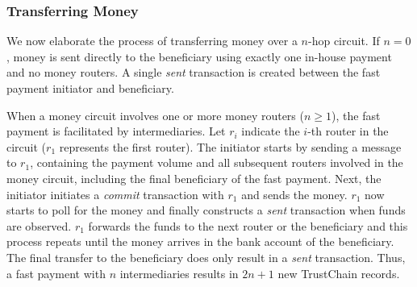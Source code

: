 \subsubsection*{Transferring Money}
We now elaborate the process of transferring money over a $ n $-hop circuit.
If $ n = 0 $, money is sent directly to the beneficiary using exactly one in-house payment and no money routers.
A single \emph{sent} transaction is created between the fast payment initiator and beneficiary.

When a money circuit involves one or more money routers ($ n \geq 1 $), the fast payment is facilitated by intermediaries.
Let $ r_i $ indicate the $ i $-th router in the circuit ($ r_1 $ represents the first router).
The initiator starts by sending a message to $ r_1 $, containing the payment volume and all subsequent routers involved in the money circuit, including the final beneficiary of the fast payment.
Next, the initiator initiates a \emph{commit} transaction with $ r_1 $ and sends the money.
$ r_1 $ now starts to poll for the money and finally constructs a \emph{sent} transaction when funds are observed.
$ r_1 $ forwards the funds to the next router or the beneficiary and this process repeats until the money arrives in the bank account of the beneficiary.
The final transfer to the beneficiary does only result in a \emph{sent} transaction.
Thus, a fast payment with $ n $ intermediaries results in $ 2n+1 $ new TrustChain records.


